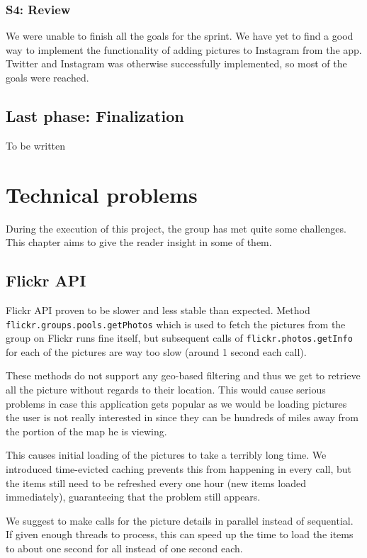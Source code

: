 \documentclass[11pt]{book}
\begin{document}
\subsection{S4: Review}
We were unable to finish all the goals for the sprint. We have yet to find a good way to implement the functionality of adding pictures to Instagram from the app. Twitter and Instagram was otherwise successfully implemented, so most of the goals were reached.

\section{Last phase: Finalization}
To be written

\chapter{Technical problems}\label{chap:technical_problems}
During the execution of this project, the group has met quite some challenges. This chapter aims to give the reader insight in some of them.

\section{Flickr API}
Flickr API proven to be slower and less stable than expected. Method \texttt{flickr.groups.pools.getPhotos} which is used to fetch the pictures from the group on Flickr runs fine itself, but subsequent calls of \texttt{flickr.photos.getInfo} for each of the pictures are way too slow (around 1 second each call).

These methods do not support any geo-based filtering and thus we get to retrieve all the picture without regards to their location. This would cause serious problems in case this application gets popular as we would be loading pictures the user is not really interested in since they can be hundreds of miles away from the portion of the map he is viewing.

This causes initial loading of the pictures to take a terribly long time. We introduced time-evicted caching prevents this from happening in every call, but the items still need to be refreshed every one hour (new items loaded immediately), guaranteeing that the problem still appears.

We suggest to make calls for the picture details in parallel instead of sequential. If given enough threads to process, this can speed up the time to load the items to about one second for all instead of one second each.
\end{document}
